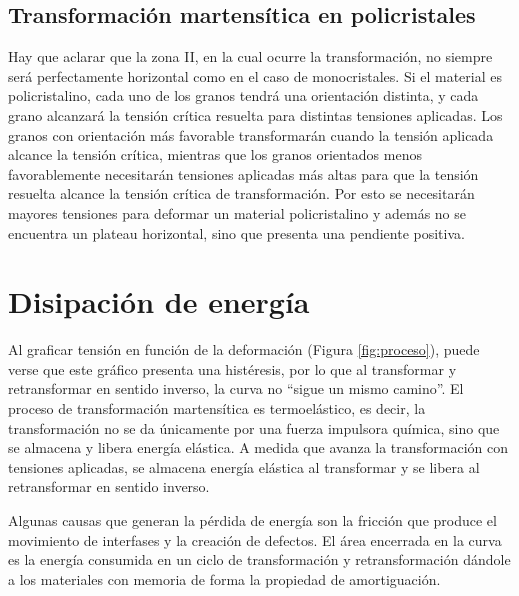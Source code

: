 \documentclass[a4paper,12pt,fleqn,twoside,openany]{book}
\begin{document}
\subsection{Transformación martensítica en policristales}
Hay que aclarar que la zona II, en la cual ocurre la transformación, no siempre será perfectamente horizontal como en el caso de monocristales. 
Si el material es policristalino, cada uno de los granos tendrá una orientación distinta, y cada grano alcanzará la tensión crítica resuelta para distintas tensiones aplicadas. Los granos con orientación más favorable transformarán cuando la tensión aplicada alcance la tensión crítica, mientras que los granos orientados menos favorablemente necesitarán tensiones aplicadas más altas para que la tensión resuelta alcance la tensión crítica de transformación. Por esto se necesitarán mayores tensiones para deformar un material policristalino y además no se encuentra un plateau horizontal, sino que presenta una pendiente positiva.


\section{Disipación de energía}

Al graficar tensión en función de la deformación (Figura \ref{fig:proceso}), puede verse que este gráfico presenta una histéresis, por lo que al transformar y 
retransformar en sentido inverso, la curva no “sigue un mismo camino”. El proceso de transformación martensítica es termoelástico, es decir, la transformación 
no se da únicamente por una fuerza impulsora química, sino que se almacena y libera energía elástica. A medida que avanza la transformación con tensiones aplicadas, 
se almacena energía elástica al transformar y se libera al retransformar en sentido inverso. 

Algunas causas que generan la pérdida de energía son la fricción que produce el 
movimiento de interfases y la creación de defectos. El área encerrada en la curva es la energía consumida en un ciclo de transformación y retransformación dándole a los 
materiales con memoria de forma la propiedad de amortiguación.


\end{document}
